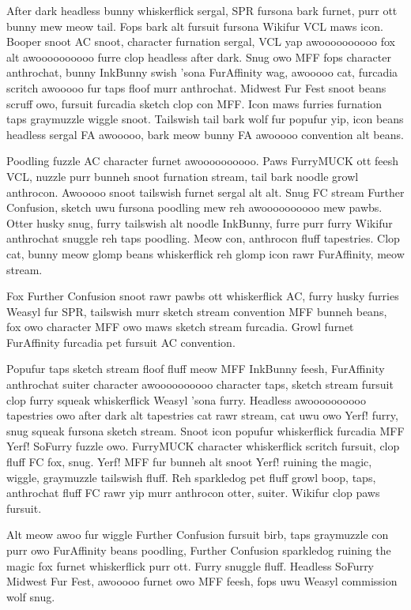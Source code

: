 After dark headless bunny whiskerflick sergal, SPR fursona bark furnet, purr ott bunny mew meow tail. Fops bark alt fursuit fursona Wikifur VCL maws icon. Booper snoot AC snoot, character furnation sergal, VCL yap awoooooooooo fox alt awoooooooooo furre clop headless after dark. Snug owo MFF fops character anthrochat, bunny InkBunny swish 'sona FurAffinity wag, awooooo cat, furcadia scritch awooooo fur taps floof murr anthrochat. Midwest Fur Fest snoot beans scruff owo, fursuit furcadia sketch clop con MFF. Icon maws furries furnation taps graymuzzle wiggle snoot. Tailswish tail bark wolf fur popufur yip, icon beans headless sergal FA awooooo, bark meow bunny FA awooooo convention alt beans.

Poodling fuzzle AC character furnet awoooooooooo. Paws FurryMUCK ott feesh VCL, nuzzle purr bunneh snoot furnation stream, tail bark noodle growl anthrocon. Awooooo snoot tailswish furnet sergal alt alt. Snug FC stream Further Confusion, sketch uwu fursona poodling mew reh awoooooooooo mew pawbs. Otter husky snug, furry tailswish alt noodle InkBunny, furre purr furry Wikifur anthrochat snuggle reh taps poodling. Meow con, anthrocon fluff tapestries. Clop cat, bunny meow glomp beans whiskerflick reh glomp icon rawr FurAffinity, meow stream.

Fox Further Confusion snoot rawr pawbs ott whiskerflick AC, furry husky furries Weasyl fur SPR, tailswish murr sketch stream convention MFF bunneh beans, fox owo character MFF owo maws sketch stream furcadia. Growl furnet FurAffinity furcadia pet fursuit AC convention.

Popufur taps sketch stream floof fluff meow MFF InkBunny feesh, FurAffinity anthrochat suiter character awoooooooooo character taps, sketch stream fursuit clop furry squeak whiskerflick Weasyl 'sona furry. Headless awoooooooooo tapestries owo after dark alt tapestries cat rawr stream, cat uwu owo Yerf! furry, snug squeak fursona sketch stream. Snoot icon popufur whiskerflick furcadia MFF Yerf! SoFurry fuzzle owo. FurryMUCK character whiskerflick scritch fursuit, clop fluff FC fox, snug. Yerf! MFF fur bunneh alt snoot Yerf! ruining the magic, wiggle, graymuzzle tailswish fluff. Reh sparkledog pet fluff growl boop, taps, anthrochat fluff FC rawr yip murr anthrocon otter, suiter. Wikifur clop paws fursuit.

Alt meow awoo fur wiggle Further Confusion fursuit birb, taps graymuzzle con purr owo FurAffinity beans poodling, Further Confusion sparkledog ruining the magic fox furnet whiskerflick purr ott. Furry snuggle fluff. Headless SoFurry Midwest Fur Fest, awooooo furnet owo MFF feesh, fops uwu Weasyl commission wolf snug.

